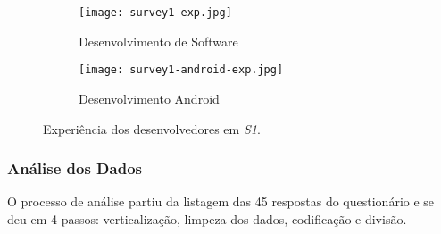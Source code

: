 \begin{figure*}
\centering
\begin{subfigure}{.5\textwidth}
  \centering
  \texttt{[image: survey1-exp.jpg]}
  \caption{Desenvolvimento de Software}
  \label{fig:sub1}
\end{subfigure}%
\begin{subfigure}{.5\textwidth}
  \centering
  \texttt{[image: survey1-android-exp.jpg]}
  \caption{Desenvolvimento Android}
  \label{fig:sub2}
\end{subfigure}
\caption{Experiência dos desenvolvedores em \textit{S1}.}
\label{fig:DadosDemograficos-Exp}
\end{figure*}


\subsubsection{Análise dos Dados}
\label{sub:smells-definition}

O processo de análise partiu da listagem das 45 respostas do questionário e se deu em 4 passos: verticalização, limpeza dos dados, codificação e divisão. 

